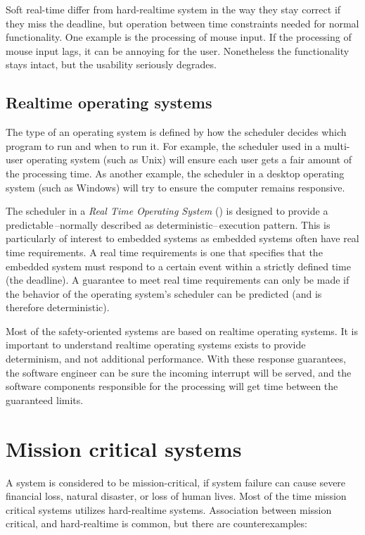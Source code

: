 Soft real-time differ from hard-realtime system in the way they stay correct if they miss the deadline, but operation between time constraints needed for normal functionality. One example is the processing of mouse input. If the processing of mouse input lags, it can be annoying for the user. Nonetheless the functionality stays intact, but the usability seriously degrades.

\subsection{Realtime operating systems}

The type of an operating system is defined by how the scheduler decides which program to run and when to run it. For example, the scheduler used in a multi-user operating system (such as Unix) will ensure each user gets a fair amount of the processing time. As another example, the scheduler in a desktop operating system (such as Windows) will try to ensure the computer remains responsive.

The scheduler in a \emph{Real Time Operating System} (\rtos) is designed to provide a predictable\,--normally described as deterministic--\,execution pattern. This is particularly of interest to embedded systems as embedded systems often have real time requirements. A real time requirements is one that specifies that the embedded system must respond to a certain event within a strictly defined time (the deadline). A guarantee to meet real time requirements can only be made if the behavior of the operating system's scheduler can be predicted (and is therefore deterministic).\citep{RTOS}

Most of the safety-oriented systems are based on realtime operating systems. It is important to understand realtime operating systems exists to provide determinism, and not additional performance. With these response guarantees, the software engineer can be sure the incoming interrupt will be served, and the software components responsible for the processing will get \cpu{} time between the guaranteed limits.

\section{Mission critical systems}
\label{sec:mission_critical_system}

A system is considered to be mission-critical, if system failure can cause severe financial loss, natural disaster, or loss of human lives. Most of the time mission critical systems utilizes hard-realtime systems. Association between mission critical, and hard-realtime is common, but there are counterexamples:

